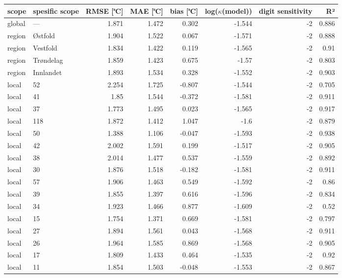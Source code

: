 \begin{tabular}{llrrrrrr}
\hline
 scope   & spesific
scope           &       RMSE
[℃] &   MAE [℃] &        bias
[℃] &   log($\kappa$(model)) &    digit
sensitivity &    R² \\
\hline
 global  & ---       & 1.871 &     1.472 &  0.302 &                 -1.544 & -2 & 0.886 \\
 region  & Østfold   & 1.904 &     1.522 &  0.067 &                 -1.571 & -2 & 0.888 \\
 region  & Vestfold  & 1.834 &     1.422 &  0.119 &                 -1.565 & -2 & 0.91  \\
 region  & Trøndelag & 1.859 &     1.423 &  0.675 &                 -1.57  & -2 & 0.803 \\
 region  & Innlandet & 1.893 &     1.534 &  0.328 &                 -1.552 & -2 & 0.903 \\
 local   & 52        & 2.254 &     1.725 & -0.807 &                 -1.544 & -2 & 0.705 \\
 local   & 41        & 1.85  &     1.544 & -0.372 &                 -1.581 & -2 & 0.911 \\
 local   & 37        & 1.773 &     1.495 &  0.023 &                 -1.565 & -2 & 0.917 \\
 local   & 118       & 1.872 &     1.412 &  1.047 &                 -1.6   & -2 & 0.879 \\
 local   & 50        & 1.388 &     1.106 & -0.047 &                 -1.593 & -2 & 0.938 \\
 local   & 42        & 2.002 &     1.591 &  0.199 &                 -1.517 & -2 & 0.905 \\
 local   & 38        & 2.014 &     1.477 &  0.537 &                 -1.559 & -2 & 0.892 \\
 local   & 30        & 1.876 &     1.518 & -0.182 &                 -1.581 & -2 & 0.911 \\
 local   & 57        & 1.906 &     1.463 &  0.549 &                 -1.592 & -2 & 0.86  \\
 local   & 39        & 1.855 &     1.397 &  0.616 &                 -1.596 & -2 & 0.834 \\
 local   & 34        & 1.923 &     1.466 &  0.877 &                 -1.609 & -2 & 0.52  \\
 local   & 15        & 1.754 &     1.371 &  0.669 &                 -1.581 & -2 & 0.797 \\
 local   & 27        & 1.894 &     1.561 &  0.043 &                 -1.568 & -2 & 0.911 \\
 local   & 26        & 1.964 &     1.585 &  0.869 &                 -1.568 & -2 & 0.905 \\
 local   & 17        & 1.809 &     1.433 &  0.464 &                 -1.535 & -2 & 0.92  \\
 local   & 11        & 1.854 &     1.503 & -0.048 &                 -1.553 & -2 & 0.867 \\
\hline
\end{tabular}
